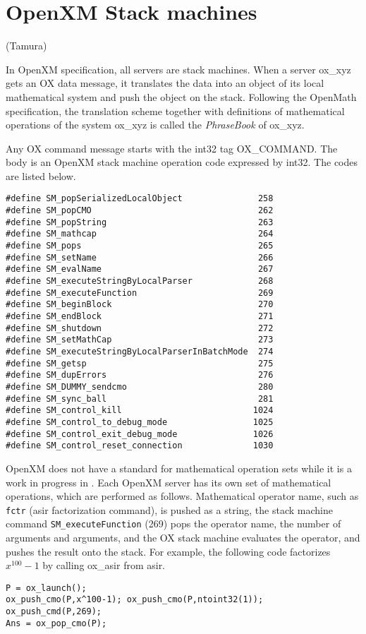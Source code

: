 
\section{OpenXM Stack machines}\label{sec:ox-stackmachines} (Tamura)

In OpenXM specification, all servers are stack machines.
When a server ox\_xyz gets an OX data message,
it translates the data into an object of its local mathematical system 
and push the object on the stack.
Following the OpenMath specification, 
the translation scheme together with definitions of mathematical operations
of the system ox\_xyz is called the {\it PhraseBook} of ox\_xyz.

Any OX command message starts with the int32 tag OX\_COMMAND.
The body is an OpenXM stack machine operation code expressed by int32.
The codes are listed below.
\begin{verbatim}
#define SM_popSerializedLocalObject               258
#define SM_popCMO                                 262
#define SM_popString                              263
#define SM_mathcap                                264
#define SM_pops                                   265
#define SM_setName                                266
#define SM_evalName                               267
#define SM_executeStringByLocalParser             268
#define SM_executeFunction                        269
#define SM_beginBlock                             270
#define SM_endBlock                               271
#define SM_shutdown                               272
#define SM_setMathCap                             273
#define SM_executeStringByLocalParserInBatchMode  274
#define SM_getsp                                  275
#define SM_dupErrors                              276
#define SM_DUMMY_sendcmo                          280
#define SM_sync_ball                              281
#define SM_control_kill                          1024
#define SM_control_to_debug_mode                 1025
#define SM_control_exit_debug_mode               1026
#define SM_control_reset_connection              1030
\end{verbatim}

OpenXM does not have a standard for mathematical operation sets
while it is a work in progress in \cite{gap}.
Each OpenXM server has its own set of mathematical operations,
which are performed as follows.
Mathematical operator name, such as {\tt fctr} (asir factorization command),
is pushed as a string,
the stack machine command
{\tt SM\_executeFunction} (269) pops the operator name, the number of arguments
and arguments, and
the OX stack machine evaluates the operator, and pushes the result onto the stack.
For example, the following code factorizes $x^{100}-1$ by calling
ox\_asir from asir.
\begin{verbatim}
P = ox_launch(); 
ox_push_cmo(P,x^100-1); ox_push_cmo(P,ntoint32(1));
ox_push_cmd(P,269); 
Ans = ox_pop_cmo(P);
\end{verbatim}

